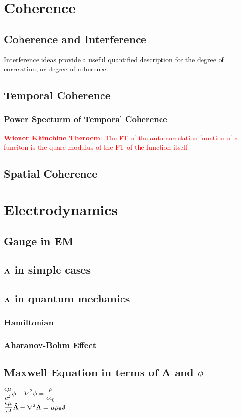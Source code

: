 \documentclass[12pt,a4paper]{article}
\newcommand{\theorem}[2]{\textbf{\textcolor{red}{#1: }}\textcolor{red}{#2}}
\begin{document}
\section{Coherence}
\subsection{Coherence and Interference}
Interference ideas provide a useful quantified description for the degree of correlation, or degree of coherence.
\subsection{Temporal Coherence}
\subsubsection{Power Specturm of Temporal Coherence}
\theorem{Wiener Khinchine Theroem}
    {The FT of the auto correlation function of a funciton is the quare modulus of the FT of the function itself}
\subsection{Spatial Coherence}
\section{Electrodynamics}
\subsection{Gauge in EM}
\subsection{$\vb{A}$ in simple cases}
\subsection{$\vb{A}$ in quantum mechanics}
\subsubsection{Hamiltonian}
\subsubsection{Aharanov-Bohm Effect}
\subsection {Maxwell Equation in terms of A and $\phi$}
$\dfrac{\epsilon\mu}{c^2}\ddot{\phi}-\nabla^2\phi = \dfrac{\rho}{\epsilon\epsilon_0}$\\
$\dfrac{\epsilon\mu}{c^2}\ddot{\vb{A}}-\nabla^2\vb{A} = \mu\mu_0\vb{J}$
\end{document}
